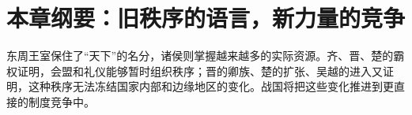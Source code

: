 \section{本章纲要：旧秩序的语言，新力量的竞争}

东周王室保住了“天下”的名分，诸侯则掌握越来越多的实际资源。齐、晋、楚的霸权证明，会盟和礼仪能够暂时组织秩序；晋的卿族、楚的扩张、吴越的进入又证明，这种秩序无法冻结国家内部和边缘地区的变化。战国将把这些变化推进到更直接的制度竞争中。
